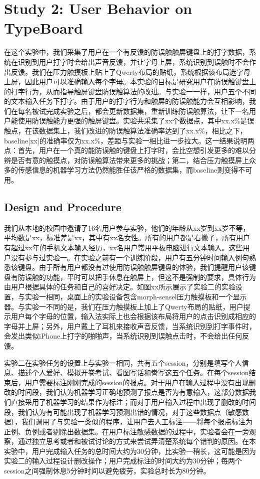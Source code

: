\section{Study 2: User Behavior on TypeBoard}

在这个实验中，我们采集了用户在一个有反馈的防误触触屏键盘上的打字数据，系统在识别到用户打字时会给出声音反馈，并让字母上屏，系统识别到误触时不会作出反馈。我们在压力触摸板上贴上了Qwerty布局的贴纸，系统根据该布局选字母上屏，因此用户可以准确输入每个字母。本实验的目标是研究用户在防误触键盘上的打字行为，从而指导触屏键盘防误触算法的改进。与实验一一样，用户五个不同的文本输入任务下打字。由于用户的打字行为和触屏的防误触能力会互相影响，我们在每名被试完成实验之后，都会更新数据集，重新训练防误触算法，让下一名用户能使用防误触能力更强的触屏键盘。实验共采集了xx个数据点，其中xx.x\%是误触点，在该数据集上，我们改进的防误触算法准确率达到了xx.x\%，相比之下，baseline[xx]的准确率仅为xx.x\%，差距与实验一相比进一步拉大。这一结果说明两点：首先，用户在一个真的能防误触的键盘上打字时，会比空想引发更多的难以分辨是否有意的触摸点，对防误触算法带来更多的挑战；第二，结合压力触摸屏上众多的传感信息的机器学习方法仍然能胜任该严格的数据集，而baseline则变得不可用。

\subsection{Design and Procedure}

我们从本地的校园中邀请了16名用户参与实验，他们的年龄从xx岁到xx岁不等，平均数是xx，标准差是xx，其中有xx名女性。所有的用户都是右撇子，所有用户有超过xx年的手机文本输入经历，xx名用户常用平板电脑进行文本输入。这些用户没有参与过实验一。在实验之前有一个训练阶段，用户有五分钟时间输入例句熟悉该键盘。由于所有用户都没有过使用防误触触屏键盘的体验，我们提醒用户该键盘有防误触的功能，平时可以把手休息在触屏上，但这不是强制的要求，具体行为由用户根据具体的任务和自己的喜好决定。如图xx所示展示了实验二的实验设置，与实验一相同，桌面上的实验设备包含morph-sensel压力触摸板和一个显示器。与实验一不同的是，我们在压力触摸板上加上了Qwerty布局的贴纸，用户提示用户每个字母的位置，输入法实际上也会根据该布局将用户的点击识别成相应的字母并上屏；另外，用户戴上了耳机来接收声音反馈，当系统识别到打字事件时，会发出类似iPhone上打字的啪啪声，当系统识别到误触点击时，不会给出任何反馈。

实验二在实验任务的设置上与实验一相同，共有五个session，分别是填写个人信息、描述个人爱好、模拟开卷考试、看图写话和誊写这五个任务。在每个session结束后，用户需要标注刚刚完成的session的报点。对于用户在输入过程中没有出现删改的时间段，我们认为机器学习正确地预测了报点是否为有意输入，这部分数据我们直接采用了机器学习的结果作为标注；而对于用户输入过程中出现了删改的时间段，我们认为有可能出现了机器学习预测出错的情况，对于这些数据点（敏感数据），我们调用了与实验一类似的程序，让用户去人工标注——将每个报点标注为正例、负例或者剔除出数据集。在用户标注敏感数据的过程中，实验者会在一旁观察，通过独立思考或者和被试讨论的方式来尝试弄清楚系统每个错判的原因。在本实验中，用户完成输入任务的总时间大约为30分钟，比实验一稍长，这可能是因为实验二的输入过程设计删改操作；用户完成标注的时间大约为30分钟；每两个session之间强制休息5分钟时间以避免疲劳，实验总时长为80分钟。

